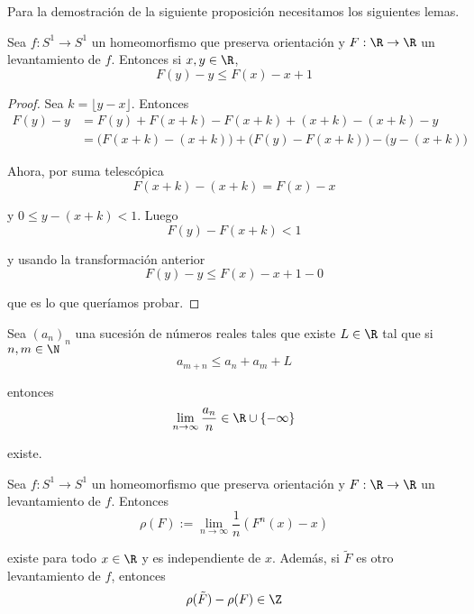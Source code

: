 \documentclass[	docname= Sistemas\ Din\'amicos,
				finished=1,
				semester=1,
				year=2017,
				professor=Godofredo\ Iommi,
				sigla=MAT2565]{apunte}
\begin{document}
Para la demostración de la siguiente proposición necesitamos los siguientes lemas.

\begin{lem} Sea $f: S^{1} \to S^{1}$ un homeomorfismo que preserva orientación y $F: \R \to \R$ un levantamiento de $f$. Entonces si $x,y \in \R$,
	$$F(y) - y \leq F(x) - x + 1$$
\end{lem}

\begin{proof} Sea $k = \lfloor y-x \rfloor$. Entonces
	\begin{align*}
		F(y) - y
			&=	F(y) + F(x+k) - F(x+k) + (x+k) - (x+k) - y	\\
			&=	\big( F(x+k) - (x+k) \big) + \big( F(y) - F(x+k) \big) - \big(y- (x+k)\big)
	\end{align*}

Ahora, por suma telescópica
	$$F(x+k) - (x+k) = F(x) - x $$

y $0 \leq y - (x+k) < 1$. Luego
	$$F(y) - F(x+k) < 1$$

y usando la transformación anterior
	$$F(y) - y \leq F(x) - x + 1 - 0$$

que es lo que queríamos probar.
\end{proof}

\begin{lem}[Fekete] Sea $(a_{n})_{n}$ una sucesión de números reales tales que existe $L \in \R$ tal que si $n,m \in \N$
	$$a_{m+n} \leq a_{n} + a_{m}+ L$$

entonces
	$$\lim_{n \to \infty} \frac{a_{n}}{n} \in \R \cup \{-\infty\}$$

existe.
\end{lem}

\begin{prop} Sea $f: S^{1} \to S^{1}$ un homeomorfismo que preserva orientación y $F: \R \to \R$ un levantamiento de $f$. Entonces
	$$\rho(F) := \lim_{n \to \infty} \frac{1}{n} (F^{n}(x) - x)$$

existe para todo $x \in \R$ y es independiente de $x$. Además, si $\tilde{F}$ es otro levantamiento de $f$, entonces
	$$\rho(\tilde{F}) - \rho(F) \in \Z$$
\end{prop}
\end{document}
